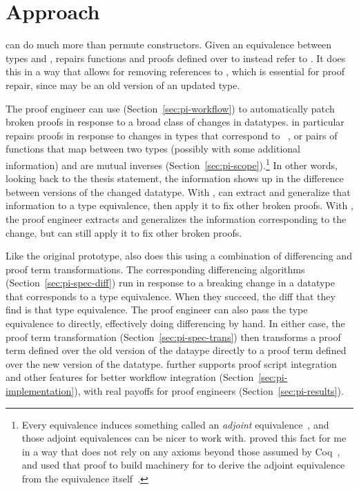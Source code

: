 \section{Approach}
\label{sec:pi-approach}


\toolnamec can do much more than permute constructors.
Given an equivalence between types \Aa and \B,
\toolnamec repairs functions and proofs defined over \Aa to instead refer to \B.
It does this in a way that allows for removing references to \Aa, which is essential for proof repair,
since \Aa may be an old version of an updated type.

The proof engineer can use \toolnamec (Section~\ref{sec:pi-workflow}) to automatically patch broken proofs in response to a broad class of changes in datatypes.
\toolnamec in particular repairs proofs in response to changes in types that correspond to ~\cite{univalent2013homotopy},
or pairs of functions that map between two types (possibly with some additional information) and are mutual 
inverses (Section~\ref{sec:pi-scope}).\footnote{Every equivalence induces something called an \textit{adjoint} equivalence~\cite{univalent2013homotopy},
and those adjoint equivalences can be nicer to work with.
 proved this fact for me in a way that does not rely on any axioms beyond those assumed by Coq~\href{https://github.com/uwplse/pumpkin-pi/blob/v2.0.0/plugin/theories/Adjoint.v}{},
and  used that proof to build machinery for \toolnamec to derive the adjoint equivalence from the equivalence itself~\href{https://github.com/uwplse/pumpkin-pi/blob/v2.0.0/plugin/src/automation/search/equivalence.ml}{}.}
In other words, looking back to the thesis statement, the information shows up in the difference between versions of the changed datatype.
With , \toolnamec can extract and generalize that information to a type equivalence, then apply it to fix other broken proofs.
With , the proof engineer extracts and generalizes the information corresponding to the change, but \toolnamec can still apply it
to fix other broken proofs.

Like the original \sysname prototype, \toolnamec also does this using a combination of differencing and proof term transformations.
The corresponding differencing algorithms (Section~\ref{sec:pi-spec-diff}) run in response to a breaking change in a datatype that corresponds to a type equivalence.
When they succeed, the diff that they find is that type equivalence.
The proof engineer can also pass the type equivalence to \toolnamec directly, effectively doing differencing by hand.
In either case, the proof term transformation (Section~\ref{sec:pi-spec-trans}) then transforms a proof term defined over the old version of the dataype
directly to a proof term defined over the new version of the datatype.
\toolnamec further supports proof script integration and other features for better workflow integration (Section~\ref{sec:pi-implementation}),
with real payoffs for proof engineers (Section~\ref{sec:pi-results}).

